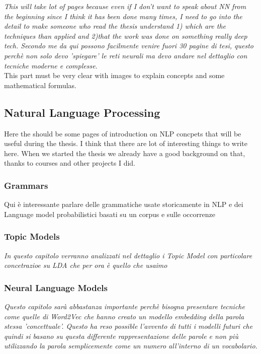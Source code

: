 \textit{This will take lot of pages because even if I don't want to speak about NN from the beginning since I think it has been done many times, I need to go into the detail to make someone who read the thesis understand 1) which are the techniques than applied and 2)that the work was done on something really deep tech. Secondo me da qui possono facilmente venire fuori 30 pagine di tesi, questo perchè non solo devo 'spiegare' le reti neurali ma devo andare nel dettaglio con tecniche moderne e complesse.} \\
This part must be very clear with images to explain concepts and some mathematical formulas.

\subsection{Natural Language Processing}
Here the should be some pages of introduction on NLP concpets that will be useful during the thesis. I think that there are lot of interesting things to write here. When we started the thesis we already have a good background on that, thanks to courses and other projects I did.
\subsubsection{Grammars}
Qui è interessante parlare delle grammatiche usate storicamente in NLP e dei Language model probabilistici basati su un corpus e sulle occorrenze

\subsubsection{Topic Models}
\textit{In questo capitolo verranno analizzati nel dettaglio i Topic Model con particolare concetrazioe su LDA che per ora è quello che usaimo}
\label{sect:LDA}

\subsubsection{Neural Language Models}
\textit{Questo capitolo sarà abbastanza importante perchè bisogna presentare tecniche come quelle di Word2Vec che hanno creato un modello embedding della parola stessa 'concettuale'. Questo ha reso possible l'avvento di tutti i modelli futuri che quindi si basano su questa differente rappresentazione delle parole e non più utilizzando la parola semplicemente come un numero all'interno di un vocabolario.
}

